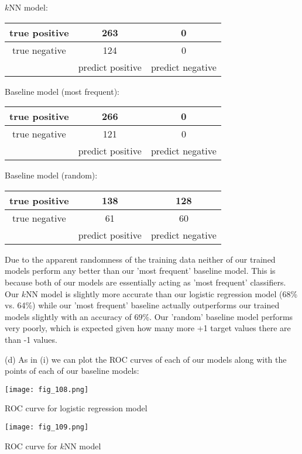 \documentclass[12pt]{article}
\begin{document}
$k$NN model:

\begin{center}
    \begin{tabular}{c|c|c|}
        \hline
        true positive & 263 & 0 \\ \hline
        true negative & 124 & 0 \\ \hline
        & predict positive & predict negative \\
    \end{tabular}
\end{center}

Baseline model (most frequent):

\begin{center}
    \begin{tabular}{c|c|c|}
        \hline
        true positive & 266 & 0 \\ \hline
        true negative & 121 & 0 \\ \hline
        & predict positive & predict negative \\
    \end{tabular}
\end{center}

Baseline model (random):

\begin{center}
    \begin{tabular}{c|c|c|}
        \hline
        true positive & 138 & 128 \\ \hline
        true negative & 61 & 60 \\ \hline
        & predict positive & predict negative \\
    \end{tabular}
\end{center}

Due to the apparent randomness of the training data neither of our trained models perform any better than our 'most frequent' baseline model. This is because both of our models are essentially acting as 'most frequent' classifiers. Our $k$NN model is slightly more accurate than our logistic regression model (68\% vs. 64\%) while our 'most frequent' baseline actually outperforms our trained models slightly with an accuracy of 69\%. Our 'random' baseline model performs very poorly, which is expected given how many more +1 target values there are than -1 values.

\noindent (d) As in (i) we can plot the ROC curves of each of our models along with the points of each of our baseline models:

\begin{center}
    \texttt{[image: fig\_108.png]}
    
    ROC curve for logistic regression model
    
    \texttt{[image: fig\_109.png]}
    
    ROC curve for $k$NN model
\end{center}
\end{document}

